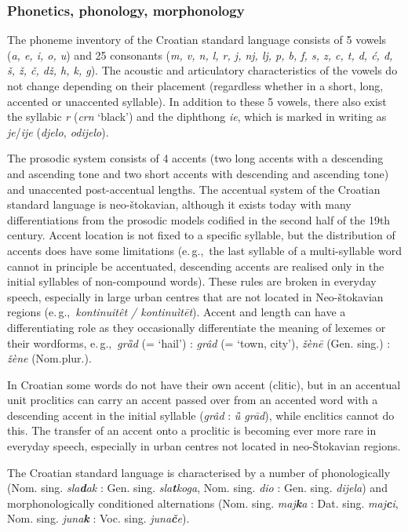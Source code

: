 \begin{multicols}{2}
\subsubsection{Phonetics, phonology, morphonology}

The phoneme inventory of the Croatian standard language consists of 5 vowels (\emph{a, e, i, o, u}) and 25 consonants (\emph{m, v, n, l, r, j, nj, lj, p, b, f, s, z, c, t, d, ć, đ, š, ž, č, dž, h, k, g}).  The acoustic and articulatory characteristics of the vowels do not change depending on their placement (regardless whether in a short, long, accented or unaccented syllable). In addition to these 5 vowels, there also exist the syllabic \emph{r} (\emph{crn} ‘black’) and the diphthong \emph{ie}, which is marked in writing as \emph{je}/\emph{ije} (\emph{djelo, odijelo}).

The prosodic system consists of 4 accents (two long accents with a descending and ascending tone and two short accents with descending and ascending tone) and unaccented post-accentual lengths. The accentual system of the Croatian standard language is neo-štokavian, although it exists today with many differentiations from the prosodic models codified in the second half of the 19th century. Accent location is not fixed to a specific syllable, but the distribution of accents does have some limitations (e.\,g.,~the last syllable of a multi-syllable word cannot in principle be accentuated, descending accents are realised only in the initial syllables of non-compound words). These rules are broken in everyday speech, especially in large urban centres that are not located in Neo-štokavian regions (e.\,g.,~\emph{kontinuitêt  / kontinuìtēt}). Accent and length can have a differentiating role as they occasionally differentiate the meaning of lexemes or their wordforms, e.\,g.,~\emph{grȁd}  (= ‘hail’) : \emph{grâd} (= ‘town, city’), \emph{žènē}  (Gen. sing.) : \emph{žène}  (Nom.plur.). 

In Croatian some words do not have their own accent (clitic), but in an accentual unit proclitics can carry an accent passed over from an accented word with a descending accent in the initial syllable (\emph{grâd} : \emph{ȕ grād}), while enclitics cannot do this. The transfer of an accent onto a proclitic is becoming ever more rare in everyday speech, especially in urban centres not located in neo-Štokavian regions.

The Croatian standard language is characterised by a number of phonologically (Nom. sing. \emph{sla\textbf{d}ak} : Gen. sing. \emph{sla\textbf{t}koga}, Nom. sing. \emph{dio} : Gen. sing. \emph{dijela}) and morphonologically conditioned alternations (Nom. sing. \emph{maj\textbf{k}a} : Dat. sing. \emph{maj\textbf{c}i}, Nom. sing. \emph{juna\textbf{k}} : Voc. sing. \emph{juna\textbf{č}e}).


\end{multicols}
